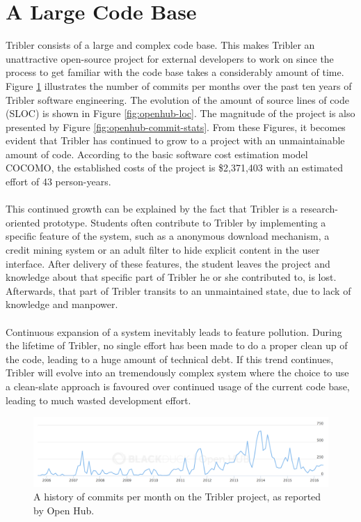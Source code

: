 \section{A Large Code Base}
Tribler consists of a large and complex code base. This makes Tribler an unattractive open-source project for external developers to work on since the process to get familiar with the code base takes a considerably amount of time. Figure \ref{fig:openhub-commits} illustrates the number of commits per months over the past ten years of Tribler software engineering. The evolution of the amount of source lines of code (SLOC) is shown in Figure \ref{fig:openhub-loc}. The magnitude of the project is also presented by Figure \ref{fig:openhub-commit-stats}. From these Figures, it becomes evident that Tribler has continued to grow to a project with an unmaintainable amount of code. According to the basic software cost estimation model COCOMO\cite{kemerer1987empirical}, the established costs of the project is \$2,371,403 with an estimated effort of 43 person-years.\\\\
This continued growth can be explained by the fact that Tribler is a research-oriented prototype. Students often contribute to Tribler by implementing a specific feature of the system, such as a anonymous download mechanism, a credit mining system or an adult filter to hide explicit content in the user interface. After delivery of these features, the student leaves the project and knowledge about that specific part of Tribler he or she contributed to, is lost. Afterwards, that part of Tribler transits to an unmaintained state, due to lack of knowledge and manpower.\\\\
Continuous expansion of a system inevitably leads to feature pollution. During the lifetime of Tribler, no single effort has been made to do a proper clean up of the code, leading to a huge amount of technical debt. If this trend continues, Tribler will evolve into an tremendously complex system where the choice to use a clean-slate approach is favoured over continued usage of the current code base, leading to much wasted development effort.

\begin{figure}[!h]
	\centering
	\includegraphics[width=\columnwidth]{images/problem_description/openhub_commits}
	\caption{A history of commits per month on the Tribler project, as reported by Open Hub.}
	\label{fig:openhub-commits}
\end{figure}

